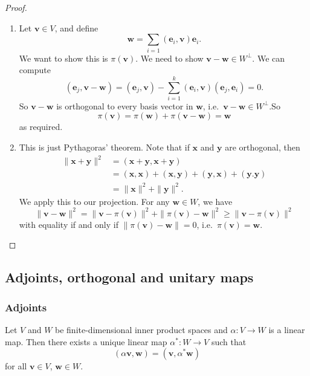 \documentclass[a4paper]{article}
\begin{document}
\begin{proof}\leavevmode
  \begin{enumerate}
    \item Let $\mathbf{v} \in V$, and define
      \[
        \mathbf{w} = \sum_{i = 1} (\mathbf{e}_i, \mathbf{v}) \mathbf{e}_i.
      \]
      We want to show this is $\pi(\mathbf{v})$. We need to show $\mathbf{v} - \mathbf{w} \in W^\perp$. We can compute
      \[
        (\mathbf{e}_j, \mathbf{v} - \mathbf{w}) = (\mathbf{e}_j, \mathbf{v}) - \sum_{i = 1}^k (\mathbf{e}_i, \mathbf{v}) (\mathbf{e}_j, \mathbf{e}_i) = 0.
      \]
      So $\mathbf{v} - \mathbf{w}$ is orthogonal to every basis vector in $\mathbf{w}$, i.e.\ $\mathbf{v} - \mathbf{w} \in W^\perp$.So
      \[
        \pi(\mathbf{v}) = \pi(\mathbf{w}) + \pi(\mathbf{v} - \mathbf{w}) = \mathbf{w}
      \]
      as required.
    \item This is just Pythagoras' theorem. Note that if $\mathbf{x}$ and $\mathbf{y}$ are orthogonal, then
      \begin{align*}
        \|\mathbf{x} + \mathbf{y}\|^2 &= (\mathbf{x} + \mathbf{y}, \mathbf{x} + \mathbf{y}) \\
        &= (\mathbf{x}, \mathbf{x}) + (\mathbf{x}, \mathbf{y}) + (\mathbf{y}, \mathbf{x}) + (\mathbf{y}. \mathbf{y})\\
        &= \|\mathbf{x}\|^2 + \|\mathbf{y}\|^2.
      \end{align*}
      We apply this to our projection. For any $\mathbf{w} \in W$, we have
      \[
        \|\mathbf{v} - \mathbf{w}\|^2 = \|\mathbf{v} - \pi (\mathbf{v})\|^2 + \|\pi(\mathbf{v}) - \mathbf{w}\|^2 \geq \|\mathbf{v} - \pi(\mathbf{v})\|^2
      \]
      with equality if and only if $\|\pi(\mathbf{v}) - \mathbf{w}\| = 0$, i.e.\ $\pi(\mathbf{v}) = \mathbf{w}$.\qedhere
  \end{enumerate}
\end{proof}

\subsection{Adjoints, orthogonal and unitary maps}
\subsubsection*{Adjoints}
\begin{lemma}
  Let $V$ and $W$ be finite-dimensional inner product spaces and $\alpha: V \to W$ is a linear map. Then there exists a unique linear map $\alpha^*: W \to V$ such that
  \[
    (\alpha \mathbf{v}, \mathbf{w}) = (\mathbf{v}, \alpha^* \mathbf{w})\tag{$*$}
  \]
  for all $\mathbf{v} \in V$, $\mathbf{w} \in W$.
\end{lemma}
\end{document}
